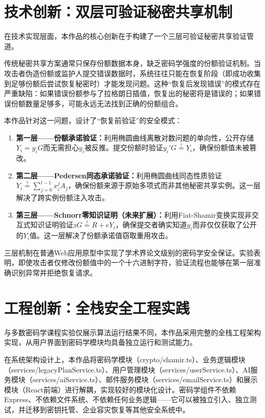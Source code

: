 \documentclass[UTF8,a4paper,zihao=-4,openany]{ctexrep}
\begin{document}
\section{技术创新：双层可验证秘密共享机制}

在技术实现层面，本作品的核心创新在于构建了一个三层可验证秘密共享验证管道。

传统秘密共享方案通常只保存份额数据本身，缺乏密码学强度的份额验证机制。当攻击者伪造份额或监护人提交错误数据时，系统往往只能在恢复阶段（即成功收集到足够份额后尝试恢复秘密时）才能发现问题。这种“恢复后发现错误”的模式存在严重缺陷：如果错误份额参与了拉格朗日插值，恢复出的秘密将是错误的；如果错误份额数量足够多，可能永远无法找到正确的份额组合。

本作品针对这一问题，设计了“恢复前验证”的安全模式：
\begin{enumerate}
  \item \textbf{第一层——份额承诺验证：}利用椭圆曲线离散对数问题的单向性，公开存储$Y_i=y_iG$而无需担心$y_i$被反推。提交份额时验证$y_i'G \stackrel{?}{=} Y_i$，确保份额值未被篡改。
  \item \textbf{第二层——Pedersen同态承诺验证：}利用椭圆曲线同态性质验证$Y_i \stackrel{?}{=} \sum_{j=0}^{t-1} x_i^j A_j$，确保份额来源于原始多项式而非其他秘密共享实例。这一层解决了跨实例份额注入攻击。
  \item \textbf{第三层——Schnorr零知识证明（未来扩展）：}利用Fiat-Shamir变换实现非交互式知识证明验证$zG \stackrel{?}{=} R + eY_i$，确保提交者确实知道$y_i$而非仅仅获取了公开的$Y_i$值。这一层解决了份额承诺值窃取重用攻击。
\end{enumerate}

三层机制在普通Web应用原型中实现了学术界论文级别的密码学安全保证。实验表明，即使攻击者仅修改份额值中的一个十六进制字符，验证流程也能够在第一层准确识别异常并拒绝恢复请求。

\section{工程创新：全栈安全工程实践}

与多数密码学课程实验仅展示算法运行结果不同，本作品采用完整的全栈工程架构实现，从用户界面到密码学模块均具备独立运行和测试能力。

在系统架构设计上，本作品将密码学模块（crypto/shamir.ts）、业务逻辑模块（services/legacyPlanService.ts）、用户管理模块（services/userService.ts）、AI服务模块（services/aiService.ts）、邮件服务模块（services/emailService.ts）和展示模块（React前端）进行解耦，实现较好的模块化设计。密码学组件不依赖Express、不依赖文件系统、不依赖任何业务逻辑——它可以被独立引入、独立测试，并迁移到密钥托管、企业容灾恢复等其他安全系统中。
\end{document}
